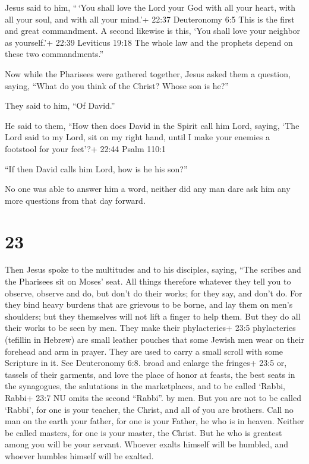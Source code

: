  Jesus said to him, ``\,`You shall love the Lord your God
with all your heart, with all your soul, and with all your mind.'+ 22:37
Deuteronomy 6:5  This is the first and great commandment.
 A second likewise is this, `You shall love your neighbor
as yourself.'+ 22:39 Leviticus 19:18  The whole law and the
prophets depend on these two commandments.''

 Now while the Pharisees were gathered together, Jesus
asked them a question,  saying, ``What do you think of the
Christ? Whose son is he?''

They said to him, ``Of David.''

 He said to them, ``How then does David in the Spirit call
him Lord, saying,  `The Lord said to my Lord, sit on my
right hand, until I make your enemies a footstool for your feet'?+ 22:44
Psalm 110:1

 ``If then David calls him Lord, how is he his son?''

 No one was able to answer him a word, neither did any man
dare ask him any more questions from that day forward.

\hypertarget{section-22}{%
\section{23}\label{section-22}}

 Then Jesus spoke to the multitudes and to his disciples,
 saying, ``The scribes and the Pharisees sit on Moses' seat.
 All things therefore whatever they tell you to observe,
observe and do, but don't do their works; for they say, and don't do.
 For they bind heavy burdens that are grievous to be borne,
and lay them on men's shoulders; but they themselves will not lift a
finger to help them.  But they do all their works to be seen
by men. They make their phylacteries+ 23:5 phylacteries (tefillin in
Hebrew) are small leather pouches that some Jewish men wear on their
forehead and arm in prayer. They are used to carry a small scroll with
some Scripture in it. See Deuteronomy 6:8. broad and enlarge the
fringes+ 23:5 or, tassels of their garments,  and love the
place of honor at feasts, the best seats in the synagogues, 
the salutations in the marketplaces, and to be called `Rabbi, Rabbi+
23:7 NU omits the second ``Rabbi''. by men.  But you are not
to be called `Rabbi', for one is your teacher, the Christ, and all of
you are brothers.  Call no man on the earth your father, for
one is your Father, he who is in heaven.  Neither be called
masters, for one is your master, the Christ.  But he who is
greatest among you will be your servant.  Whoever exalts
himself will be humbled, and whoever humbles himself will be exalted.

